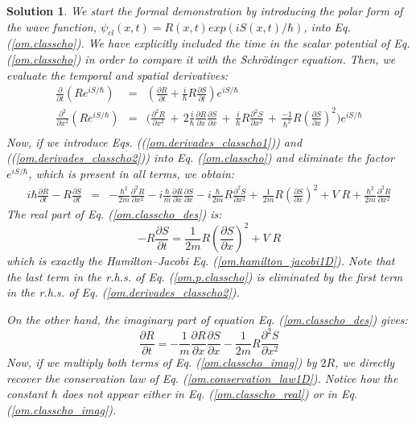 \documentclass[onecolumn,nofootinbib, secnumarabic, amsmath, nobibnotes,11pt,aps,pra]{revtex4-1}
\newtheorem{solution}{Solution}
\newcommand{\pref}[1]{(\ref{#1})}
\newcommand{\eref}[1]{Eq. (\ref{#1})}
\begin{document}
\begin{solution}
We start the formal demonstration by introducing the polar form of the wave function, $\psi_{cl}(x,t) = R(x,t) exp(i S(x,t)/\hbar)$, into \eref{om.classcho}. We have explicitly included the time in the scalar potential of \eref{om.classcho} in order to compare it with the Schr\"odinger equation. Then, we evaluate the temporal and spatial derivatives:
\begin{eqnarray}
\label{om.derivades_classcho1}
\frac {\partial} {\partial t} \left(Re^{i S/\hbar}\right)& = &\left( \frac {\partial R} {\partial t} + \frac {i} {\hbar} R\frac{\partial S} {\partial t} \right)e^{i S/\hbar}\\
\label{om.derivades_classcho2}
\frac {\partial^2} {\partial x^2} \left(Re^{i S/\hbar}\right) & = &\!\Bigg( \frac {\partial^2 R} {\partial x^2} \,{+}\, 2 \frac {i} {\hbar} \frac{\partial R} {\partial x} \frac{\partial S} {\partial x} \,{+}\, \frac {i} {\hbar} R \frac{\partial^2 S} {\partial x^2} \,{+}\, \frac {-1} {\hbar^2} R \left( \frac{\partial S} {\partial x}\right)^2\! \Bigg) e^{i S/\hbar}\nonumber\\
\end{eqnarray}
Now, if we introduce Eqs. (\pref{om.derivades_classcho1}) and
(\pref{om.derivades_classcho2}) into \eref{om.classcho} and
eliminate the factor $e^{i S/\hbar}$, which is present in all terms,
we obtain:
\begin{eqnarray}
\label{om.classcho_des}
i \hbar \frac {\partial R} {\partial t} - R\frac{\partial S}
{\partial t} &=& -\frac {\hbar^2}{2m} \frac {\partial^2 R} {\partial
x^2} - i\frac {\hbar}{m} \frac{\partial R} {\partial x}
\frac{\partial S} {\partial x} - i \frac {\hbar}{2m} R
\frac{\partial^2 S} {\partial x^2} +\, \frac {1} {2m} R \left(
\frac{\partial S} {\partial x}\right)^2+ V \; R + \frac {\hbar^{2}} {2 m} \frac { {\partial}^2 R} {\partial x^2}
\end{eqnarray}
The real part of \eref{om.classcho_des} is:
\begin{equation}
\label{om.classcho_real}
 -R\frac{\partial S} {\partial t} = \frac {1} {2m} R \left( \frac{\partial S} {\partial x}\right)^2 + V \; R
\end{equation}
which is exactly the Hamilton--Jacobi \eref{om.hamilton_jacobi1D}. Note that the last term in the r.h.s. of \eref{om.p.classcho} is eliminated by the first term in the r.h.s. of \eref{om.derivades_classcho2}.

On the other hand, the imaginary part of equation \eref{om.classcho_des} gives:
\begin{equation}
\label{om.classcho_imag}
 \frac {\partial R} {\partial t} = -\frac {1}{m} \frac{\partial R} {\partial x} \frac{\partial S} {\partial x} - \frac {1}{2m} R \frac{\partial^2 S} {\partial x^2}
\end{equation}
Now, if we multiply both terms of \eref{om.classcho_imag} by $2 R$,
we directly recover the conservation law of
\eref{om.conservation_law1D}. Notice how the constant $\hbar$ does
not appear either in \eref{om.classcho_real} or in
\eref{om.classcho_imag}.
\end{solution}
\end{document}
